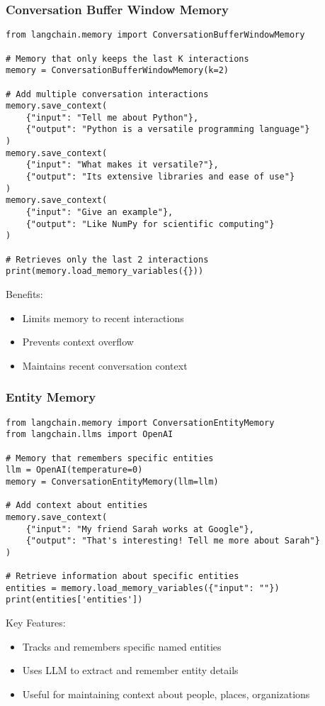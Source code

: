 \begin{frame}[fragile]\frametitle{Conversation Buffer Window Memory}

\begin{lstlisting}
from langchain.memory import ConversationBufferWindowMemory

# Memory that only keeps the last K interactions
memory = ConversationBufferWindowMemory(k=2)

# Add multiple conversation interactions
memory.save_context(
    {"input": "Tell me about Python"},
    {"output": "Python is a versatile programming language"}
)
memory.save_context(
    {"input": "What makes it versatile?"},
    {"output": "Its extensive libraries and ease of use"}
)
memory.save_context(
    {"input": "Give an example"},
    {"output": "Like NumPy for scientific computing"}
)

# Retrieves only the last 2 interactions
print(memory.load_memory_variables({}))
\end{lstlisting}

Benefits:
\begin{itemize}
\item Limits memory to recent interactions
\item Prevents context overflow
\item Maintains recent conversation context
\end{itemize}

\end{frame}

\begin{frame}[fragile]\frametitle{Entity Memory}

\begin{lstlisting}
from langchain.memory import ConversationEntityMemory
from langchain.llms import OpenAI

# Memory that remembers specific entities
llm = OpenAI(temperature=0)
memory = ConversationEntityMemory(llm=llm)

# Add context about entities
memory.save_context(
    {"input": "My friend Sarah works at Google"},
    {"output": "That's interesting! Tell me more about Sarah"}
)

# Retrieve information about specific entities
entities = memory.load_memory_variables({"input": ""})
print(entities['entities'])
\end{lstlisting}

Key Features:
\begin{itemize}
\item Tracks and remembers specific named entities
\item Uses LLM to extract and remember entity details
\item Useful for maintaining context about people, places, organizations
\end{itemize}

\end{frame}

